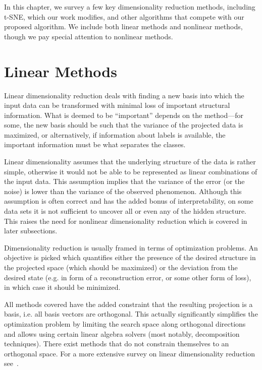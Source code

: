In this chapter, we survey a few key dimensionality reduction methods,
including t-SNE, which our work modifies, and other algorithms that compete
with our proposed algorithm.  We include both linear methods and nonlinear
methods, though we pay special attention to nonlinear methods.

\section{Linear Methods}

Linear dimensionality reduction deals with finding a new basis into which
the input data can be transformed with minimal loss of important structural
information.  What is deemed to be ``important'' depends on the method---for
some, the new basis should be such that the variance of the projected data is
maximized, or alternatively, if information about labels is available, the
important information must be what separates the classes.

Linear dimensionality assumes that the underlying structure of the data is
rather simple, otherwise it would not be able to be represented as linear
combinations of the input data. This assumption implies that the variance of
the error (or the noise) is lower than the variance of the observed phenomenon.
Although this assumption is often correct and has the added bonus of
interpretability, on some data sets it is not sufficient to uncover all or even
any of the hidden structure. This raises the need for nonlinear dimensionality
reduction which is covered in later subsections.

Dimensionality reduction is usually framed in terms of optimization problems. An
objective is picked which quantifies either the presence of the desired structure
in the projected space (which should be maximized) or the deviation from the desired
state (e.g. in form of a reconstruction error, or some other form of loss), in which case
it should be minimized.

All methods covered have the added constraint that the resulting projection is
a basis, i.e. all basis vectors are orthogonal. This actually significantly
simplifies the optimization problem by limiting the search space along
orthogonal directions and allows using certain linear algebra solvers (most
notably, decomposition techniques). There exist methods that do not constrain
themselves to an orthogonal space. For a more extensive survey on linear
dimensionality reduction see~\cite{linearsurvey}.


